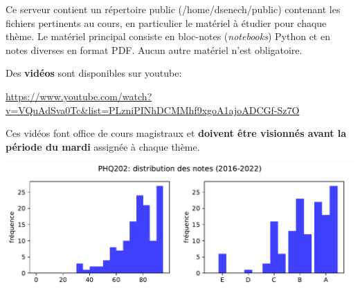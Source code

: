 \documentclass[10pt,usletter]{article}
\begin{document}
Ce serveur contient un répertoire public (/home/dsenech/public) contenant les fichiers pertinents au cours, en particulier le matériel à étudier pour chaque thème. Le matériel principal consiste en bloc-notes ({\it notebooks}) Python et en notes diverses en format PDF.
Aucun autre matériel n'est obligatoire.

Des \textbf{vidéos} sont disponibles sur youtube:

\url{https://www.youtube.com/watch?v=VQuAdSva0Tc&list=PLzniPINhDCMMhf9xgoA1ajoADCGf-Sz7O}

 Ces vidéos font office de cours magistraux et \textbf{doivent être visionnés avant la période du mardi} assignée à chaque thème. 

\begin{center}
\includegraphics[width=\hsize]{stats.pdf}
\end{center}


\end{document}
